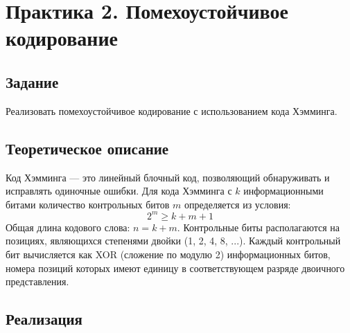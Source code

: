 \chapter{Практика 2. Помехоустойчивое кодирование}

\section{Задание}
Реализовать помехоустойчивое кодирование с использованием кода Хэмминга.

\section{Теоретическое описание}
Код Хэмминга — это линейный блочный код, позволяющий обнаруживать и исправлять одиночные ошибки. Для кода Хэмминга с $k$ информационными битами количество контрольных битов $m$ определяется из условия:
\[
2^m \geq k + m + 1
\]
Общая длина кодового слова: $n = k + m$. Контрольные биты располагаются на позициях, являющихся степенями двойки (1, 2, 4, 8, ...). Каждый контрольный бит вычисляется как XOR (сложение по модулю 2) информационных битов, номера позиций которых имеют единицу в соответствующем разряде двоичного представления.

\section{Реализация}

